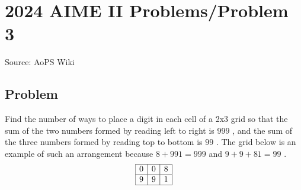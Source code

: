 \documentclass[12pt]{article}
\begin{document}
\section*{{2024 AIME II Problems/Problem 3}}
Source: AoPS Wiki

\subsection*{Problem}
Find the number of ways to place a digit in each cell of a 2x3 grid so that the sum of the two numbers formed by reading left to right is $999$ , and the sum of the three numbers formed by reading top to bottom is $99$ . The grid below is an example of such an arrangement because $8+991=999$ and $9+9+81=99$ . \[\begin{array}{|c|c|c|} \hline 0 & 0 & 8 \\ \hline 9 & 9 & 1 \\ \hline \end{array}\]
\end{document}
